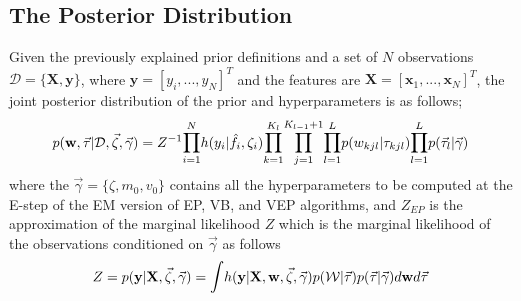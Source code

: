 \documentclass[]{article}
\begin{document}
\subsection{The Posterior Distribution}
Given the previously explained prior definitions and a set of $N$ observations $\mathcal{D} = \{\mathbf{X}, \mathbf{y}\}$, where $\mathbf{y} = [y_i,...,y_N]^T$ and the features are $\mathbf{X} = [\mathbf{x}_1,...,\mathbf{x}_N]^T$, the joint posterior distribution of the prior and hyperparameters is as follows;
\begin{equation}
	p(\mathbf{w}, \vec{\tau}|\mathcal{D},\vec{\zeta},\vec{\gamma}) = Z^{-1}\mathlarger \prod_{i=1}^N h(y_i|\hat{f}_i,\zeta_i)\mathlarger \prod_{k=1}^{K_l}\mathlarger \prod_{j=1}^{K_{l-1}+1}\mathlarger \prod_{l=1}^{L} p(w_{kjl}|\tau_{kjl})\mathlarger \prod_{l=1}^{L} p(\vec{\tau}_l|\vec{\gamma})
	\label{equ:19}
\end{equation} 
where the $\vec{\gamma} = \{\zeta, m_0, v_0\}$ contains all the hyperparameters to be computed at the E-step of the EM version of EP, VB, and VEP algorithms, and $Z_{EP}$ is the approximation of the marginal likelihood $Z$ which is the marginal likelihood of the observations conditioned on $\vec{\gamma}$ as follows
\begin{equation}
	Z = p(\mathbf{y} | \mathbf{\mathbf{X}},\vec{\zeta},\vec{\gamma}) = \mathlarger \int h(\mathbf{y}|\mathbf{X},\mathbf{w},\vec{\zeta},\vec{\gamma}) p(\mathcal{W}|\vec{\tau}) p(\vec{\tau}|\vec{\gamma}) d\mathbf{w}d\vec{\tau}
	\label{equ:20}
\end{equation} 
\end{document}
